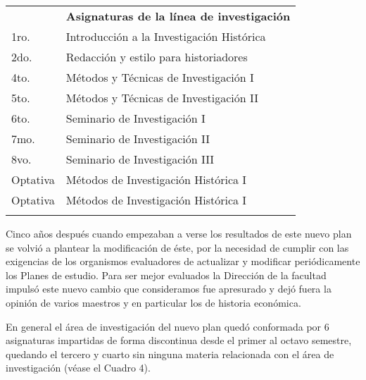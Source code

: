 \bigskip
\begin{flushleft}
\tablefirsthead{}
\tablehead{}
\tabletail{}
\tablelasttail{}
\setlength{\extrarowheight}{1pt}
\begin{supertabular}{|m{0.2\textwidth}|m{0.75\textwidth}|}
\hline
{}\\\hline
{} &
{\small \bfseries Asignaturas de la línea de investigación}\\\hline
1ro. &
Introducción a la Investigación Histórica\\\hline
2do.  &
Redacción y estilo para historiadores\\\hline
4to. &
Métodos y Técnicas de Investigación I\\\hline
5to. &
Métodos y Técnicas de Investigación II\\\hline
6to. &
 Seminario de Investigación I\\\hline
7mo. &
 Seminario de Investigación II\\\hline
8vo. &
 Seminario de Investigación III\\\hline
Optativa &
Métodos de Investigación Histórica I\\\hline
Optativa &
Métodos de Investigación Histórica I\\\hline\hline
{}\\\hline
\end{supertabular}
\end{flushleft}

\smallskip
\enlargethispage{1\baselineskip}
Cinco años después cuando empezaban a verse los resultados de este 
nuevo plan se volvió a plantear la modificación de éste, por la 
necesidad de cumplir con las exigencias de los organismos evaluadores 
de actualizar y modificar periódicamente los Planes de estudio. Para 
ser mejor evaluados la Dirección de la facultad impulsó este nuevo 
cambio que consideramos fue apresurado y dejó fuera la opinión de 
varios maestros y en particular los de historia económica.

En general el área de investigación del nuevo plan quedó conformada por 
6 asignaturas impartidas de forma discontinua desde el primer al octavo 
semestre, quedando el tercero y cuarto sin ninguna materia relacionada 
con el área de investigación (véase el Cuadro 4).


